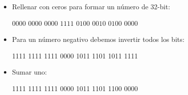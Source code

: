 \documentclass[11pt]{article}
\begin{document}
\begin{itemize}
\begin{itemize}
			\item Rellenar con ceros para formar un número de 32-bit: 
			
			$0000$ $0000$ $0000$ $1111$ $0100$ $0010$ $0100$ $0000$
			
			\item Para un número negativo debemos invertir todos los bits:
			
			1111 1111 1111 0000 1011 1101 1011 1111
			
			\item Sumar uno:
			
			1111 1111 1111 0000 1011 1101 1100 0000
			
			
			
		\end{itemize}
		
		
	\end{itemize}
	
	
	\nocite{BinaryNu62:online}
	
	
	
	
	\vspace{0.1 in}
	
\end{document}
